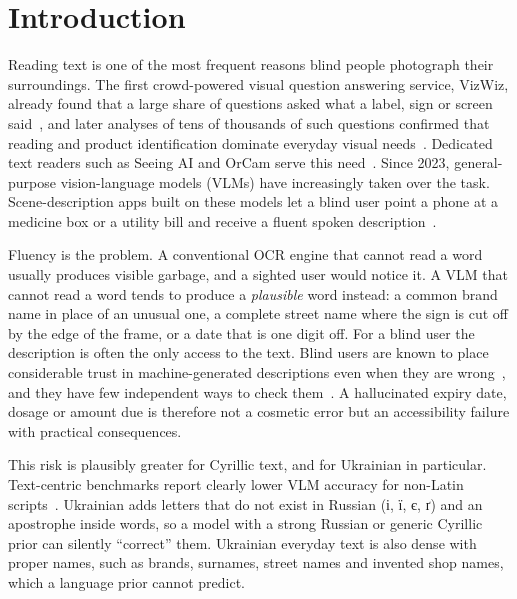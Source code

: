\section{Introduction}\label{sec:intro}

Reading text is one of the most frequent reasons blind people photograph their surroundings. The first crowd-powered visual question answering service, VizWiz, already found that a large share of questions asked what a label, sign or screen said~\cite{bigham2010vizwiz}, and later analyses of tens of thousands of such questions confirmed that reading and product identification dominate everyday visual needs~\cite{brady2013visual,gurari2018vizwiz}. Dedicated text readers such as Seeing AI and OrCam serve this need~\cite{granquist2021evaluation,khan2020insight}. Since 2023, general-purpose vision-language models (VLMs) have increasingly taken over the task. Scene-description apps built on these models let a blind user point a phone at a medicine box or a utility bill and receive a fluent spoken description~\cite{gonzalezpenuela2024investigating,xie2025beyond,adnin2024king}.

Fluency is the problem. A conventional OCR engine that cannot read a word usually produces visible garbage, and a sighted user would notice it. A VLM that cannot read a word tends to produce a \emph{plausible} word instead: a common brand name in place of an unusual one, a complete street name where the sign is cut off by the edge of the frame, or a date that is one digit off. For a blind user the description is often the only access to the text. Blind users are known to place considerable trust in machine-generated descriptions even when they are wrong~\cite{macleod2017understanding}, and they have few independent ways to check them~\cite{alharbi2024misfitting,hong2024understanding}. A hallucinated expiry date, dosage or amount due is therefore not a cosmetic error but an accessibility failure with practical consequences.

This risk is plausibly greater for Cyrillic text, and for Ukrainian in particular. Text-centric benchmarks report clearly lower VLM accuracy for non-Latin scripts~\cite{liu2024ocrbench,tang2025mtvqa}. Ukrainian adds letters that do not exist in Russian (\foreignlanguage{ukrainian}{і, ї, є, ґ}) and an apostrophe inside words, so a model with a strong Russian or generic Cyrillic prior can silently ``correct'' them. Ukrainian everyday text is also dense with proper names, such as brands, surnames, street names and invented shop names, which a language prior cannot predict.

